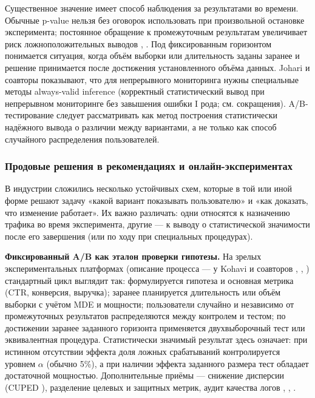 Существенное значение имеет способ наблюдения за результатами во времени. Обычные p-value нельзя без оговорок использовать при произвольной остановке эксперимента; постоянное обращение к промежуточным результатам увеличивает риск ложноположительных выводов \cite{ref19}, \cite{ref20}. Под фиксированным горизонтом понимается ситуация, когда объём выборки или длительность заданы заранее и решение принимается после достижения установленного объёма данных. Johari и соавторы \cite{ref19} показывают, что для непрерывного мониторинга нужны специальные методы always-valid inference (корректный статистический вывод при непрерывном мониторинге без завышения ошибки I рода; см. сокращения). A/B-тестирование следует рассматривать как метод построения статистически надёжного вывода о различии между вариантами, а не только как способ случайного распределения пользователей.

\subsubsection{Продовые решения в рекомендациях и онлайн-экспериментах}\label{ux43fux440ux43eux434ux43eux432ux44bux435-ux440ux435ux448ux435ux43dux438ux44f-ux432-ux440ux435ux43aux43eux43cux435ux43dux434ux430ux446ux438ux44fux445-ux438-ux43eux43dux43bux430ux439ux43d-ux44dux43aux441ux43fux435ux440ux438ux43cux435ux43dux442ux430ux445}

В индустрии сложились несколько устойчивых схем, которые в той или иной форме решают задачу «какой вариант показывать пользователю» и «как доказать, что изменение работает». Их важно различать: одни относятся к назначению трафика во время эксперимента, другие --- к выводу о статистической значимости после его завершения (или по ходу при специальных процедурах).

\textbf{Фиксированный A/B как эталон проверки гипотезы.} На зрелых экспериментальных платформах (описание процесса --- у Kohavi и соавторов \cite{ref5}, \cite{ref10}, \cite{ref20}) стандартный цикл выглядит так: формулируется гипотеза и основная метрика (CTR, конверсия, выручка); заранее планируется длительность или объём выборки с учётом MDE и мощности; пользователи случайно и независимо от промежуточных результатов распределяются между контролем и тестом; по достижении заранее заданного горизонта применяется двухвыборочный тест или эквивалентная процедура. Статистически значимый результат здесь означает: при истинном отсутствии эффекта доля ложных срабатываний контролируется уровнем $\alpha$ (обычно 5\%), а при наличии эффекта заданного размера тест обладает достаточной мощностью. Дополнительные приёмы --- снижение дисперсии (CUPED \cite{ref7}), разделение целевых и защитных метрик, аудит качества логов \cite{ref6}, \cite{ref10}, \cite{ref11}.

